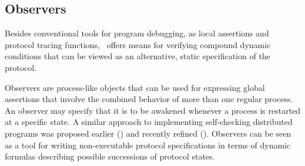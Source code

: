 \subsection{Observers}

Besides conventional tools for program debugging, as local
assertions and protocol tracing functions, \smurph\ offers means for
verifying compound dynamic conditions that can be viewed as an alternative,
static specification of the protocol.

Observers are process-like objects that can be used for expressing global
assertions that involve the combined behavior of more than one regular process.
An observer may specify that it is to be awakened whenever a
process is restarted at a specific state.
A similar approach to implementing self-checking distributed programs
was proposed earlier (\cite{aad79}) and recently refined (\cite{gro86}).
Observers can be seen as a tool for writing non-executable protocol
specifications in terms of dynamic formulas describing possible successions
of protocol states.
